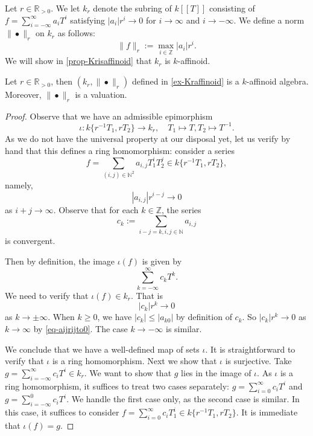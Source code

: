 \begin{example}\label{ex-Kraffinoid}
    Let $r\in \mathbb{R}_{>0}$. We let $k_r$ denote the subring of $k[[T]]$ consisting of $f=\sum_{i=-\infty}^{\infty} a_i T^i$ satisfying $|a_i| r^i\to 0$ for $i\to \infty$ and $i\to -\infty$. We define a norm $\|\bullet\|_r$ on $k_r$ as follows:
    \[
          \|f\|_{r}:=\max_{i\in \mathbb{Z}}|a_i| r^i.
    \]
    We will show in \cref{prop-Krisaffinoid} that $k_r$ is $k$-affinoid.
\end{example}
\begin{proposition}\label{prop-Krisaffinoid}
    Let $r\in \mathbb{R}_{>0}$, then $(k_r,\|\bullet\|_r)$ defined in \cref{ex-Kraffinoid} is a $k$-affinoid algebra. Moreover, $\|\bullet\|_r$ is a valuation.
\end{proposition}
\begin{proof}
    Observe that we have an admissible epimorphism
    \[
        \iota:k\{r^{-1}T_1,rT_2\}\rightarrow k_r,\quad T_1\mapsto T, T_2\mapsto T^{-1}.  
    \]
    As we do not have the universal property at our disposal yet, let us verify by hand that this defines a ring homomorphism: consider a series
    \[
        f=\sum_{(i,j)\in \mathbb{N}^2} a_{i,j}T_1^i T_2^j\in  k\{r^{-1}T_1,rT_2\}, 
    \]
    namely, 
    \begin{equation}\label{eq-aijrijto0}
        |a_{i,j}|r^{i-j}\to 0  
    \end{equation}
    as $i+j\to \infty$. Observe that for each $k\in \mathbb{Z}$, the series 
    \[
        c_k:=  \sum_{i-j=k,i,j\in \mathbb{N}} a_{i,j}
    \]
    is convergent.

    Then by definition, the image $\iota(f)$ is given by
    \[
        \sum_{k=-\infty}^{\infty} c_k T^{k}.
    \]
    We need to verify that $\iota(f)\in k_r$. That is 
    \[
        |c_k|r^k\to 0  
    \]
    as $k\to \pm\infty$. When $k\geq 0$, we have $|c_k|\leq |a_{k0}|$ by definition of $c_k$. So $|c_k|r^k\to 0$ as $k\to\infty$ by \eqref{eq-aijrijto0}. The case $k\to -\infty$ is similar.

    We conclude that we have a well-defined map of sets $\iota$. It is straightforward to verify that $\iota$ is a ring homomorphism. Next we show that $\iota$ is surjective. Take $g=\sum_{i=-\infty}^{\infty} c_i T^i\in k_r$. We want to show that $g$ lies in the image of $\iota$. As $\iota$ is a ring homomorphism, it suffices to treat two cases separately: $g=\sum_{i=0}^{\infty} c_i T^i$ and $g=\sum_{i=-\infty}^0 c_iT^i$. We handle the first case only, as the second case is similar. In this case, it suffices to consider $f=\sum_{i=0}^{\infty} c_i T_1^i\in k\{r^{-1}T_1,rT_2\}$. It is immediate that $\iota(f)=g$.



\end{proof}

